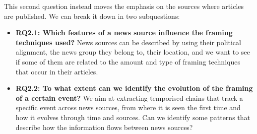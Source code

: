 \vspace{12px}

This second question instead moves the emphasis on the sources where articles are published. We can break it down in two subquestions:

\begin{itemize}
    \item \textbf{RQ2.1: Which features of a news source influence the framing techniques used?}
    News sources can be described by using their political alignment, the news group they belong to, their location, and we want to see if some of them are related to the amount and type of framing techniques that occur in their articles.
    
    \item \textbf{RQ2.2: To what extent can we identify the evolution of the framing of a certain event?}
    We aim at extracting temporised chains that track a specific event across news sources, from where it is seen the first time and how it evolves through time and sources.
    Can we identify some patterns that describe how the information flows between news sources?
    
    
    
\end{itemize}
